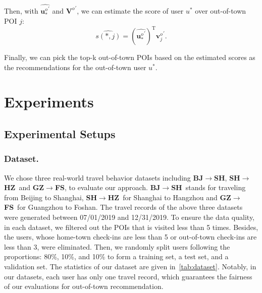 \documentclass[letterpaper]{article} %
\newcommand{\bjsh}{{\bf BJ\ensuremath{\rightarrow}SH}}
\newcommand{\shhz}{{\bf SH\ensuremath{\rightarrow}HZ}}
\newcommand{\gzfs}{{\bf GZ\ensuremath{\rightarrow}FS}}
\begin{document}
Then, with $\widehat{{\mathbf{u}^o_{\ast}}^{\prime}}$ and ${\mathbf{V}^o}^{\prime}$, we can estimate the score of user $u^{\ast}$ over out-of-town POI $j$:
\begin{equation} \label{e:rec_score}
    \widehat{s({\ast},j)} = 
    \left(\widehat{{\mathbf{u}^o_{\ast}}^{\prime}}\right)^\mathrm{T}
    {\mathbf{v}^o_j}^{\prime} .
\end{equation}

Finally, we can pick the top-k out-of-town POIs based on the estimated scores as the recommendations for the out-of-town user $u^{\ast}$. 



\section{Experiments}

\subsection{Experimental Setups}

\subsubsection{Dataset.} 
We chose three real-world travel behavior datasets including \bjsh, \shhz ~and \gzfs, to evaluate our approach.
\bjsh ~stands for traveling from Beijing to Shanghai, \shhz ~for Shanghai to Hangzhou and \gzfs ~for Guangzhou to Foshan. 
The travel records of the above three datasets were generated between 07/01/2019 and 12/31/2019. 
To ensure the data quality, in each dataset, we filtered out the POIs that is visited less than 5 times. 
Besides, the users, whose home-town check-ins are less than 5 or out-of-town check-ins are less than 3, were eliminated. 
%
Then, we randomly split users following the proportions: 80\%, 10\%, and 10\% to form a training set, a test set, and a validation set. 
% 
The statistics of our dataset are given in~\cref{tab:dataset}.
Notably, in our datasets, each user has only one travel record, which guarantees the fairness of our evaluations for out-of-town recommendation. %
\end{document}
